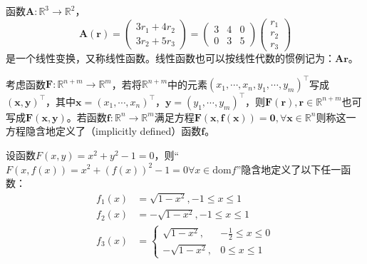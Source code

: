 \documentclass[main.tex]{subfiles}
\begin{document}
\begin{example}
函数$\mathbf{A}:\mathbb{R}^3\rightarrow\mathbb{R}^2$，
\[\mathbf{A}\left(\mathbf{r}\right)=\left(\begin{array}{c}3r_1+4r_2\\3r_2+5r_3\end{array}\right)=\left(\begin{array}{ccc}3&4&0\\0&3&5\end{array}\right)\left(\begin{array}{c}r_1\\r_2\\r_3\end{array}\right)\]
是一个线性变换，又称线性函数。线性函数也可以按线性代数的惯例记为：$\mathbf{Ar}$。
\end{example}

\begin{definition}[隐函数]
考虑函数$\mathbf{F}:\mathbb{R}^{n+m}\rightarrow\mathbb{R}^m$，若将$\mathbb{R}^{n+m}$中的元素$\left(x_1,\cdots,x_n,y_1,\cdots,y_m\right)^\intercal$写成$\left(\mathbf{x},\mathbf{y}\right)^\intercal$，其中$\mathbf{x}=\left(x_1,\cdots,x_n\right)^\intercal$，$\mathbf{y}=\left(y_1,\cdots,y_m\right)^\intercal$，则$\mathbf{F}\left(\mathbf{r}\right),\mathbf{r}\in\mathbb{R}^{n+m}$也可写成$\mathbf{F}\left(\mathbf{x},\mathbf{y}\right)$。若函数$\mathbf{f}:\mathbb{R}^n\rightarrow\mathbb{R}^m$满足方程$\mathbf{F}\left(\mathbf{x},\mathbf{f}\left(\mathbf{x}\right)\right)=\mathbf{0},\forall\mathbf{x}\in\mathbb{R}^n$则称这一方程隐含地定义了（implicitly defined）函数$\mathbf{f}$。
\end{definition}

\begin{example}
设函数$F\left(x,y\right)=x^2+y^2-1=0$，则“$F\left(x,f\left(x\right)\right)=x^2+\left(f\left(x\right)\right)^2-1=0\forall x\in\mathrm{dom}f$”隐含地定义了以下任一函数：
\begin{align*}
    f_1\left(x\right)&=\sqrt{1-x^2},-1\leq x\leq 1\\
    f_2\left(x\right)&=-\sqrt{1-x^2},-1\leq x\leq 1\\
    f_3\left(x\right)&=\left\{\begin{array}{ll}
    \sqrt{1-x^2},&-\frac{1}{2}\leq x\leq 0\\
    -\sqrt{1-x^2},&0\leq x\leq 1
    \end{array}\right.
\end{align*}
\end{example}
\end{document}
